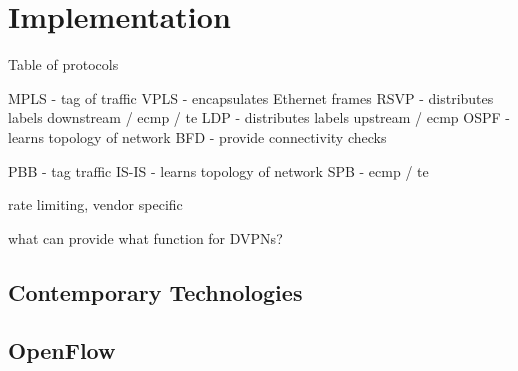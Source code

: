 \section{Implementation} %
\label{sec:implementation}

Table of protocols

MPLS - tag of traffic
VPLS - encapsulates Ethernet frames
RSVP - distributes labels downstream / ecmp / te
LDP - distributes labels upstream / ecmp
OSPF - learns topology of network
BFD - provide connectivity checks

PBB - tag traffic
IS-IS - learns topology of network
SPB - ecmp / te

rate limiting, vendor specific

what can provide what function for DVPNs?

\subsection{Contemporary Technologies} %
\label{sub:contemporary_technologies}


\subsection{OpenFlow} %
\label{sub:openflow}



